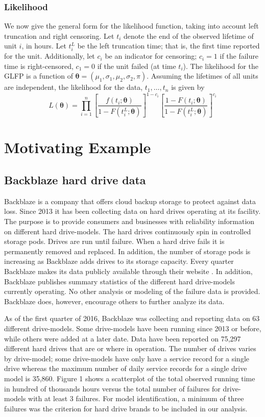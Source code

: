 \documentclass[12pt]{article}
\begin{document}
\subsubsection{Likelihood}
We now give the general form for the likelihood function, taking into account left truncation and right censoring.  Let $t_{i}$ denote the end of the observed lifetime of unit $i$, in hours.  Let $t_i^L$ be the left truncation time; that is, the first time reported for the unit.  Additionally, let $c_i$ be an indicator for censoring; $c_i=1$ if the failure time is right-censored, $c_1=0$ if the unit failed (at time $t_i$). The likelihood for the GLFP is a function of $\bm{\theta} = (\mu_1, \sigma_1, \mu_2, \sigma_2, \pi)$.  Assuming the lifetimes of all units are independent, the likelihood for the data, $t_1,\ldots,t_n$ is given by
\begin{equation*}
L(\bm{\theta})= \prod_{i=1}^{n} \left[\frac{f(t_i;\bm{\theta})}{1-F(t_i^L;\bm{\theta})}\right]^{1-c_i} \left[ \frac{1-F(t_i;\bm{\theta})}{1-F(t_i^L;\bm{\theta})} \right]^{c_i}
\end{equation*}

\section{Motivating Example}
\subsection{Backblaze hard drive data}
\label{sec:Data}
Backblaze is a company that offers cloud backup storage to protect against data loss.  Since 2013 it has been collecting data on hard drives operating at its facility.  The purpose is to provide consumers and businesses with reliability information on different hard drive-models.  The hard drives continuously spin in controlled storage pods.  Drives are run until failure.  When a hard drive fails it is permanently removed and replaced.  In addition, the number of storage pods is increasing as Backblaze adds drives to its storage capacity.  Every quarter Backblaze makes its data publicly available through their website \cite{backblaze}. In addition, Backblaze publishes summary statistics of the different hard drive-models currently operating.  No other analysis or modeling of the failure data is provided.  Backblaze does, however, encourage others to further analyze its data. 

As of the first quarter of 2016, Backblaze was collecting and reporting data on 63 different drive-models.  Some drive-models have been running since 2013 or before, while others were added at a later date.  Data have been reported on 75,297 different hard drives that are or where in operation.  The number of drives varies by drive-model; some drive-models have only have a service record for a single drive whereas the maximum number of daily service records for a single drive model is 35,860.  Figure 1 shows a scatterplot of the total observed running time in hundred of thousands hours versus the total number of failures for drive-models with at least 3 failures.  For model identification, a minimum of three failures was the criterion for hard drive brands to be included in our analysis.  
\end{document}
